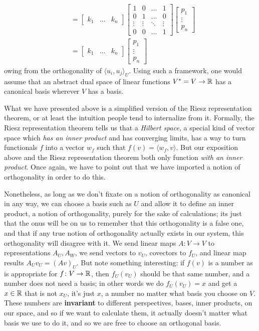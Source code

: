 \documentclass[11pt]{article}
\begin{document}
\begin{align*}
&= \begin{bmatrix} k_1 & \dots & k_n \end{bmatrix} \begin{bmatrix} 1 & 0  & \dots & 1 \\ 0 & 1 & \dots & 0 \\ \vdots & \vdots & \ddots & \vdots \\ 0 & 0 & \dots & 1 \end{bmatrix} \begin{bmatrix} p_1 \\ \vdots \\ p_n \end{bmatrix} \\
&= \begin{bmatrix} k_1 & \dots & k_n \end{bmatrix}  \begin{bmatrix} p_1 \\ \vdots \\ p_n \end{bmatrix}
\end{align*}
owing from the orthogonality of $\langle u_i, u_j \rangle_U$. Using such a framework, one would assume that an abstract dual space of linear functions  $V^* = V \to \mathbb{R}$ has a canonical basis wherever $V$ has a basis.

What we have presented above is a simplified version of the Riesz representation theorem, or at least the intuition people tend to internalize from it. Formally, the Riesz representation theorem tells us that a \emph{Hilbert space}, a special kind of vector space which \emph{has an inner product} and has converging limits, has a way to turn functionals $f$ into a vector $w_f$ such that $f(v) = \langle w_f, v \rangle$. But our exposition above and the Riesz representation theorem both only function \emph{with an inner product}. Once again, we have to point out that we have imported a notion of orthogonality in order to do this.

Nonetheless, as long as we don't fixate on a notion of orthogonality as canonical in any way, we can choose a basis such as $U$ and allow it to define an inner product, a notion of orthogonality, purely for the sake of calculations; its just that the onus will be on us to remember that this orthogonality is a false one, and that if any true notion of orthogonality actually exists in our system, this orthogonality will disagree with it. We send linear maps $A \colon V \to V$ to representations $A_U, A_W$, we send vectors to $v_U$, covectors to $f_U$, and linear map results $A_U v_U = (Av)_U$. But note something interesting: if $f(v)$ is a number as is appropriate for $f \colon V \to \mathbb{R}$, then $f_U(v_U)$ should be that same number, and a number does not need a basis; in other words we do $f_U(v_U) = x$ and get a $x \in \mathbb{R}$ that is not $x_U$, it's just $x$, a number no matter what basis you choose on $V$. These numbers are \textbf{invariant} to different perspectives, bases, inner products, on our space, and so if we want to calculate them, it actually doesn't matter what basis we use to do it, and so we are free to choose an orthogonal basis.
\end{document}

